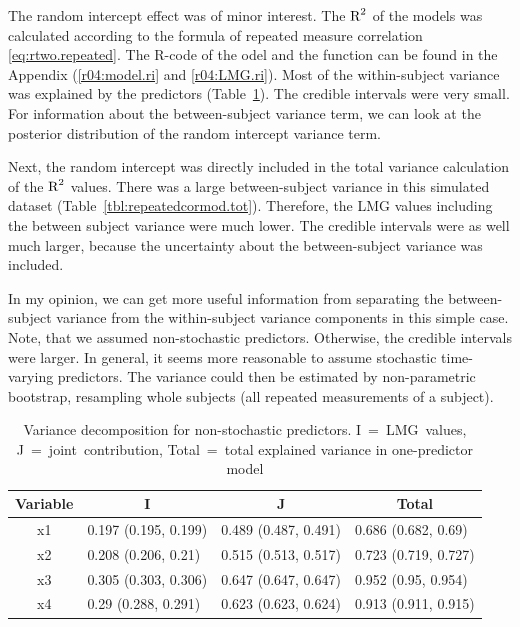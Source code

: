 \documentclass[11pt,a4paper,twoside]{book}\usepackage[]{graphicx}\usepackage[]{color}
\begin{document}
 The random intercept effect was of minor interest. The $\text{R}^2$ of the models was calculated according to the formula of repeated measure correlation \eqref{eq:rtwo.repeated}. The R-code of the odel and the function can be found in the Appendix (\ref{r04:model.ri} and \ref{r04:LMG.ri}). Most of the within-subject variance was explained by the predictors (Table~\ref{tbl:repeatedcormod}). The credible intervals were very small. For information about the between-subject variance term, we can look at the posterior distribution of the random intercept variance term.

Next, the random intercept was directly included in the total variance calculation of the $\text{R}^2$ values. There was a large between-subject variance in this simulated dataset (Table~\ref{tbl:repeatedcormod.tot}). Therefore, the LMG values including the between subject variance were much lower. The credible intervals were as well much larger, because the uncertainty about the between-subject variance was included. 

In my opinion, we can get more useful information from separating the between-subject variance from the within-subject variance components in this simple case. Note, that we assumed non-stochastic predictors. Otherwise, the credible intervals were larger. In general, it seems more reasonable to assume stochastic time-varying predictors. The variance could then be estimated by non-parametric bootstrap, resampling whole subjects (all repeated measurements of a subject).







\begin{table}[h]
\caption{Variance decomposition for non-stochastic predictors. I~=~LMG~values, J~=~joint~contribution, Total~=~total explained variance in one-predictor model}
\centering
\begin{tabular}{clll}
  \toprule
  \multicolumn{1}{c}{\textbf{Variable}} & \multicolumn{1}{c}{\textbf{I}} &\multicolumn{1}{c}{\textbf{J}} & \multicolumn{1}{c}{\textbf{Total}} \\
  \hline
x1 & 0.197 (0.195, 0.199)  & 0.489 (0.487, 0.491)   & 0.686 (0.682, 0.69)  \\ 
x2 & 0.208 (0.206, 0.21)  & 0.515 (0.513, 0.517)   & 0.723 (0.719, 0.727)  \\ 
x3 & 0.305 (0.303, 0.306)  & 0.647 (0.647, 0.647)   & 0.952 (0.95, 0.954)  \\ 
x4 & 0.29 (0.288, 0.291)  & 0.623 (0.623, 0.624)   & 0.913 (0.911, 0.915)  \\ 
   \bottomrule
\end{tabular}
\label{tbl:repeatedcormod}
\end{table}
\end{document}
